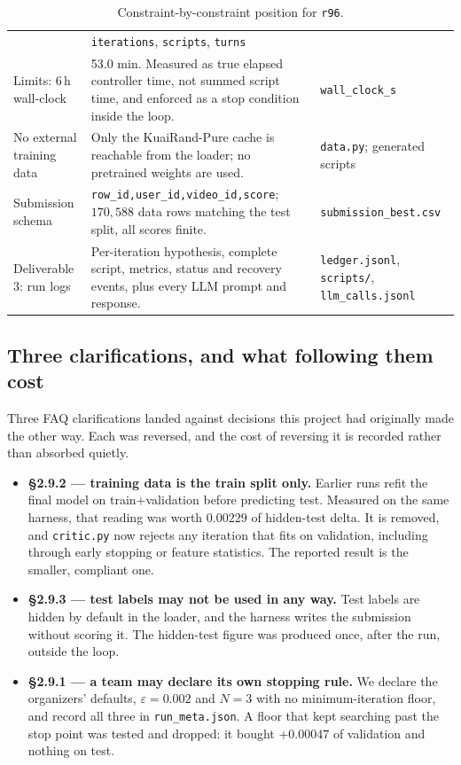 \documentclass[11pt,a4paper]{article}
\newcommand{\code}[1]{\texttt{#1}}
\newcommand{\file}[1]{\texttt{#1}}
\begin{document}
\begin{table}[htbp]
\begin{tabular}{@{}p{3.4cm}p{7.3cm}p{4.2cm}@{}}
 & \code{iterations}, \code{scripts}, \code{turns} \\
\addlinespace
Limits: 6\,h wall-clock
 & 53.0 min. Measured as true elapsed controller time, not summed script time, and enforced as
   a stop condition inside the loop.
 & \code{wall\_clock\_s} \\
\addlinespace
No external training data
 & Only the KuaiRand-Pure cache is reachable from the loader; no pretrained weights are used.
 & \file{data.py}; generated scripts \\
\addlinespace
Submission schema
 & \code{row\_id,user\_id,video\_id,score}; $170{,}588$ data rows matching the test split, all
   scores finite.
 & \file{submission\_best.csv} \\
\addlinespace
Deliverable 3: run logs
 & Per-iteration hypothesis, complete script, metrics, status and recovery events, plus every
   LLM prompt and response.
 & \file{ledger.jsonl}, \file{scripts/}, \file{llm\_calls.jsonl} \\
\bottomrule
\end{tabular}
\caption{Constraint-by-constraint position for \texttt{r96}.}
\label{tab:compliance}
\end{table}

\subsection{Three clarifications, and what following them cost}

Three FAQ clarifications landed against decisions this project had originally made the other
way. Each was reversed, and the cost of reversing it is recorded rather than absorbed quietly.

\begin{itemize}[leftmargin=1.3em, itemsep=4pt]
  \item \textbf{\S2.9.2 --- training data is the train split only.} Earlier runs refit the final
        model on train$+$validation before predicting test. Measured on the same harness, that
        reading was worth $0.00229$ of hidden-test delta. It is removed, and
        \file{critic.py} now rejects any iteration that fits on validation, including through
        early stopping or feature statistics. The reported result is the smaller, compliant one.
  \item \textbf{\S2.9.3 --- test labels may not be used in any way.} Test labels are hidden by
        default in the loader, and the harness writes the submission without scoring it. The
        hidden-test figure was produced once, after the run, outside the loop.
  \item \textbf{\S2.9.1 --- a team may declare its own stopping rule.} We declare the
        organizers' defaults, $\varepsilon = 0.002$ and $N = 3$ with no minimum-iteration floor,
        and record all three in \file{run\_meta.json}. A floor that kept searching past the stop
        point was tested and dropped: it bought $+0.00047$ of validation and nothing on test.
\end{itemize}
\end{document}
